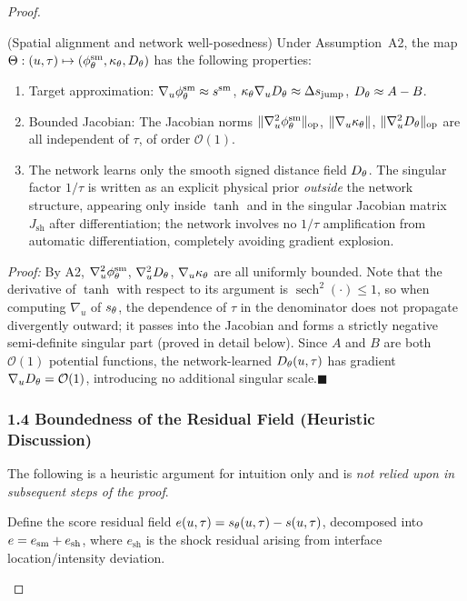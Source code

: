 \begin{proof}
\begin{lemma}\label{lem:1.2}
(Spatial alignment and network well-posedness) Under Assumption~A2, the map $\Theta: (u,\tau) \mapsto (\phi^{\mathrm{sm}}_{\theta}, \kappa_{\theta}, D_{\theta})$ has the following properties:
\begin{enumerate}
  \item Target approximation: $\nabla_u \phi^{\mathrm{sm}}_{\theta} \approx s^{\mathrm{sm}}$, $\kappa_{\theta} \nabla_u D_{\theta} \approx \Delta s_{\mathrm{jump}}$, $D_{\theta} \approx A-B$.
  \item Bounded Jacobian: The Jacobian norms $\lVert \nabla_u^2 \phi^{\mathrm{sm}}_{\theta} \rVert_{\mathrm{op}}$, $\lVert \nabla_u \kappa_{\theta} \rVert$, $\lVert \nabla_u^2 D_{\theta} \rVert_{\mathrm{op}}$ are all independent of $\tau$, of order $\mathcal{O}(1)$.
  \item The network learns only the smooth signed distance field $D_{\theta}$. The singular factor $1/\tau$ is written as an explicit physical prior \emph{outside} the network structure, appearing only inside $\tanh$ and in the singular Jacobian matrix $J_{\mathrm{sh}}$ after differentiation; the network involves no $1/\tau$ amplification from automatic differentiation, completely avoiding gradient explosion.
\end{enumerate}
\end{lemma}

\textit{Proof:} By A2, $\nabla_u^2 \phi^{\mathrm{sm}}_{\theta}$, $\nabla_u^2 D_{\theta}$, $\nabla_u \kappa_{\theta}$ are all uniformly bounded. Note that the derivative of $\tanh$ with respect to its argument is $\operatorname{sech}^2(\cdot) \leq 1$, so when computing $\nabla_u$ of $s_{\theta}$, the dependence of $\tau$ in the denominator does not propagate divergently outward; it passes into the Jacobian and forms a strictly negative semi-definite singular part (proved in detail below).
Since $A$ and $B$ are both $\mathcal{O}(1)$ potential functions, the network-learned $D_{\theta}(u, \tau)$ has gradient $\nabla_u D_{\theta} = \mathcal{O}(1)$, introducing no additional singular scale.\hfill$\blacksquare$

\subsubsection{1.4 Boundedness of the Residual Field (Heuristic Discussion)}

\begin{remark}
The following is a heuristic argument for intuition only and is \emph{not relied upon in subsequent steps of the proof}.

Define the score residual field $e(u,\tau) = s_{\theta}(u,\tau) - s(u,\tau)$, decomposed into $e = e_{\mathrm{sm}} + e_{\mathrm{sh}}$, where $e_{\mathrm{sh}}$ is the shock residual arising from interface location/intensity deviation.


\end{remark}
\end{proof}
